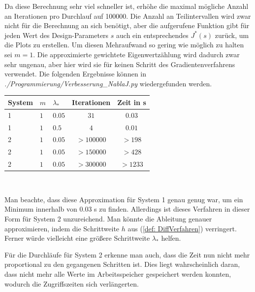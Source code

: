 \documentclass[a4paper,12pt]{report}
\newcommand{\1}{\mathds{1}}
\theoremstyle{plain} %
\theoremstyle{definition} %
\theoremstyle{remark}
\begin{document}
            Da diese Berechnung sehr viel schneller ist, erhöhe die maximal mögliche Anzahl an Iterationen pro Durchlauf auf 100000.
            Die Anzahl an Teilintervallen wird zwar nicht für die Berechnung an sich benötigt, aber die aufgerufene Funktion gibt für jeden Wert des Design-Parameters $s$ auch ein entsprechendes $J^*(s)$ zurück, um die Plots zu erstellen.
            Um diesen Mehraufwand so gering wie möglich zu halten sei $m=1$. Die approximierte gewichtete Eigenwertzählung wird dadurch zwar sehr ungenau, aber hier wird sie für keinen Schritt des Gradientenverfahrens verwendet.
            Die folgenden Ergebnisse können in \textit{./Programmierung/Verbesserung\_NablaJ.py} wiedergefunden werden.

            \begin{table}[!ht]
                  \centering
                  \begin{tabular}{lllcc}
                       System & $m$ & $\lambda_*$ & Iterationen & Zeit in s\\
                       \hline
                       1 & $1$ & $0.05$ & $31$ & $0.03$ \\ 
                       \hline
                       1 & $1$ & $0.5$ & $4$ & $0.01$ \\
                       \hline
                       2 & $1$ & $0.05$ & $>100000$ & $>198$ \\
                       2 & $1$ & $0.05$ & $>150000$ & $>428$ \\
                       2 & $1$ & $0.05$ & $>300000$ & $>1233$ \\
                       \hline
                  \end{tabular}\\
                  \label{tab: Ergebnisse_nablaJ}
            \end{table}

            Man beachte, dass diese Approximation für System 1 genau genug war, um ein Minimum innerhalb von 0.03 s zu finden.
            Allerdings ist dieses Verfahren in dieser Form für System 2 unzureichend. Man könnte die Ableitung genauer approximieren, indem die Schrittweite $h$ aus (\ref{def: DiffVerfahren}) verringert.
            Ferner würde vielleicht eine größere Schrittweite $\lambda_*$ helfen.

            Für die Durchläufe für System 2 erkenne man auch, dass die Zeit nun nicht mehr proportional zu den gegangenen Schritten ist.
            Dies liegt wahrscheinlich daran, dass nicht mehr alle Werte im Arbeitsspeicher gespeichert werden konnten, wodurch die Zugriffszeiten sich verlängerten.
\end{document}
